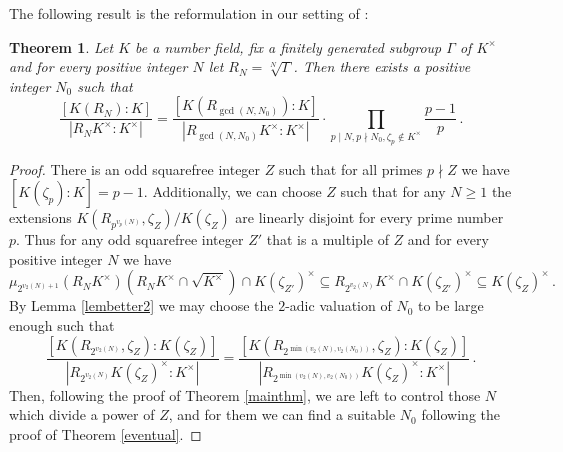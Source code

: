\documentclass[11pt, a4paper]{amsart}
\newtheorem {thm}{Theorem}
\theoremstyle{definition}
\renewcommand{\geq}{\geqslant}
\begin{document}
The following result is the reformulation in our setting of \cite[Theorem 1]{MAMA}:

\begin{thm}\label{MAMA}
Let $K$ be a number field, fix a finitely generated subgroup $\Gamma$ of $K^\times$ and for every positive integer $N$ let $R_N=\sqrt[N]{\Gamma}$. Then there exists a positive integer $N_0$ such that 
$$\frac{[K(R_N):K]}{|R_NK^\times:K^\times|}=\frac{[K(R_{\gcd(N,N_0)}):K]}{|R_{\gcd(N,N_0)}K^\times:K^\times|}\cdot \prod_{p\mid N, p\nmid N_0, \zeta_p \notin K^\times} \frac{p-1}{p}\,.$$
\end{thm}
\begin{proof}
There is an odd squarefree integer $Z$ such that for all primes $p\nmid Z$ we have $[K(\zeta_p):K]=p-1$.
Additionally, we can choose $Z$ such that for any $N\geq 1$ the extensions $K(R_{p^{v_p(N)}}, \zeta_Z)/K(\zeta_Z)$ are linearly disjoint for every prime number $p$. Thus 
for any odd squarefree integer $Z'$ that is a multiple of $Z$ and for every positive integer $N$ we have 
$$\mu_{2^{v_2(N)+1}}(R_N K^\times)(R_N K^\times\cap\sqrt{K^\times})\cap K(\zeta_{Z'})^\times \subseteq R_{2^{v_2(N)}} K^\times\cap K(\zeta_{Z'})^\times \subseteq  K(\zeta_{Z})^\times\,.$$
By Lemma \ref{lembetter2} we may choose the $2$-adic valuation of $N_0$ to be large enough such that 
$$\frac{[K(R_{2^{v_2(N)}}, \zeta_Z):K(\zeta_Z)]}{|R_{2^{v_2(N)}}K(\zeta_Z)^\times:K^\times|}=\frac{[K(R_{2^{\min (v_2(N), v_2(N_0))}}, \zeta_Z):K(\zeta_Z)]}{|R_{2^{\min (v_2(N), v_2(N_0))}}K(\zeta_Z)^\times:K^\times|}\,.$$
Then, following the proof of Theorem \ref{mainthm}, we are left to control those $N$ which divide a power of $Z$, and for them we can find a suitable $N_0$ following the proof of Theorem \ref{eventual}.
\end{proof}
\end{document}
